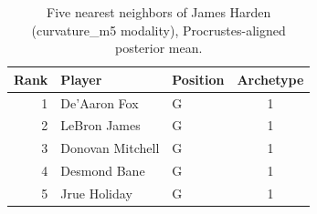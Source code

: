 \begin{table}[htbp]
  \centering\small
  \begin{tabular}{rllc}
    \toprule
    Rank & Player & Position & Archetype \\
    \midrule
    1 & De'Aaron Fox & G & 1 \\
    2 & LeBron James & G & 1 \\
    3 & Donovan Mitchell & G & 1 \\
    4 & Desmond Bane & G & 1 \\
    5 & Jrue Holiday & G & 1 \\
    \bottomrule
  \end{tabular}
  \caption{Five nearest neighbors of James Harden (curvature_m5 modality), Procrustes-aligned posterior mean.}
  \label{tab:James_Harden_neighbors_curvature_m5}
\end{table}

